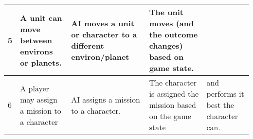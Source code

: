 \begin{center}
\begin{longtable}{| p{.5cm} | p{4.5cm} | p{4.5cm} | p{4.5cm} |}
    \\ \hline

    5 &

    A unit can move between environs or planets. &

    AI moves a unit or character to a different environ/planet &

    The unit moves (and the outcome changes) based on game state.

    \\ \hline

    6 &

    A player may assign a mission to a character &

    AI assigns a mission to a character. &

    The character is assigned the mission based on the game state &
    and performs it best the character can.

    \\ \hline



  \end{longtable}

\end{center}
